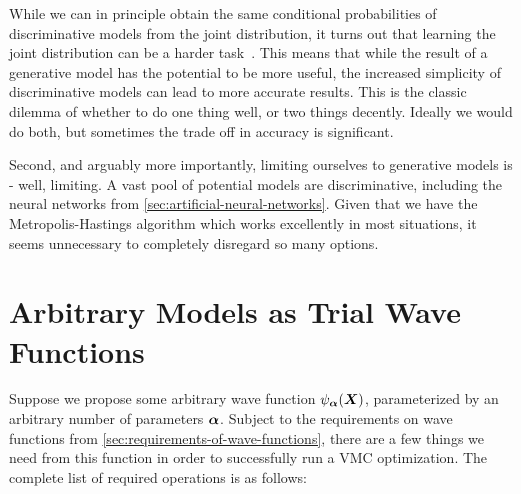 \documentclass[Thesis.tex]{subfiles}
\begin{document}
While we can in principle obtain the same conditional probabilities of
discriminative models from the joint distribution, it turns out that learning
the joint distribution can be a harder task~\cite{Ng-2001}. This means that
while the result of a generative model has the potential to be more useful, the
increased simplicity of discriminative models can lead to more accurate results.
This is the classic dilemma of whether to do one thing well, or two things
decently. Ideally we would do both, but sometimes the trade off in accuracy is
significant.

Second, and arguably more importantly, limiting ourselves to generative models
is - well, limiting. A vast pool of potential models are discriminative,
including the neural networks from \cref{sec:artificial-neural-networks}. Given
that we have the Metropolis-Hastings algorithm which works excellently in 
most situations, it seems unnecessary to completely disregard so many options.


\section{Arbitrary Models as Trial Wave Functions}

Suppose we propose some arbitrary wave function $\psi_{\bm{\alpha}}(\bm{X})$, parameterized
by an arbitrary number of parameters $\bm{\alpha}$. Subject to the
requirements on wave functions from \cref{sec:requirements-of-wave-functions},
there are a few things we need from this function in order to successfully run a
VMC optimization. The complete list of required operations is as follows:
\end{document}
